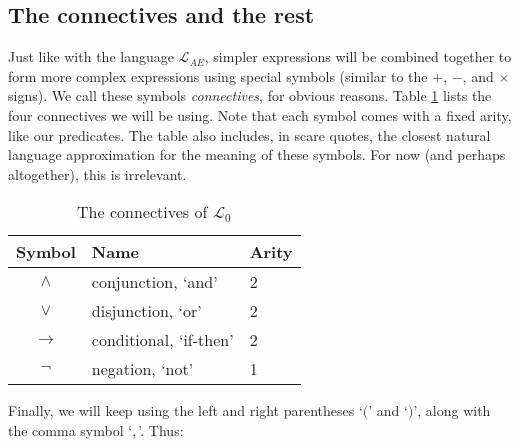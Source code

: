 \subsection{The connectives and the rest}

Just like with the language $\mathcal{L}_{AE}$, simpler expressions will be combined together to form more complex expressions using special symbols (similar to the $+$, $-$, and $\times$ signs). We call these symbols \textit{connectives}, for obvious reasons. Table \ref{connect} lists the four connectives we will be using. Note that each symbol comes with a fixed arity, like our predicates. The table also includes, in scare quotes, the closest natural language approximation for the meaning of these symbols. For now (and perhaps altogether), this is irrelevant. 


\begin{table}[h]
\begin{center}
\begin{tabular}{c|l|l}
Symbol & Name & Arity \\ \hline
$\wedge$ & conjunction, `and' & 2  \\
$\vee$ & disjunction, `or' & 2 \\
$\rightarrow$ & conditional, `if-then' & 2 \\
$\neg$ & negation, `not' & 1
\end{tabular}
\end{center}
\caption{The connectives of $\mathcal{L}_0$}
\label{connect}
\end{table}



Finally, we will keep using the left and right parentheses `$($' and `$)$', along with the comma symbol `$,$'. Thus: 


